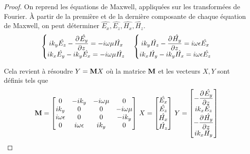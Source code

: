         \begin{proof}
            On reprend les équations de Maxwell, appliquées sur les transformées de Fourier. À partir de la première et de la dernière composante de chaque équation de Maxwell, on peut déterminer \(\hat{E_x},\hat{E_z},\hat{H_x},\hat{H_z}\).
            \begin{align*}
                \left\lbrace
                \begin{matrix}
                    ik_y \hat{E_z}  - \ddr{z}{\hat{E_y}} = -i \w \mu \hat{H_x}
                    \\
                    ik_x \hat{E_y} - ik_y \hat{E_x} = -i\w \mu \hat{H_z}
                \end{matrix}
                \right. \quad
                \left\lbrace
                \begin{matrix}
                    ik_y \hat{H_z}  - \ddr{z}{\hat{H_y}} = i \w \eps \hat{E_x}
                    \\
                    ik_x \hat{H_y} - ik_y \hat{H_x} = i\w \eps \hat{E_z}
                \end{matrix}
                \right.
            \end{align*}

            Cela revient à résoudre \(Y = \mat{M}X\) où la matrice \(\mat{M}\) et les vecteurs \(X, Y\) sont définis tels que
            \begin{equation}
              \mat{M} =
              \begin{bmatrix}
              0 & -ik_y & -i\w\mu & 0
              \\
              ik_y & 0 & 0 & -i\w\mu
              \\
              i\w\eps & 0 & 0 & -ik_y
              \\
              0 & i\w\eps & ik_y & 0
              \end{bmatrix}
              \,
              X =
              \begin{bmatrix}
                \hat{E_x}\\
                \hat{E_z}\\
                \hat{H_x}\\
                \hat{H_z}
              \end{bmatrix}
              \,
              Y =
              \begin{bmatrix}
                -\ddr{z}{\hat{E_y}}\\
                ik_x\hat{E_z}\\
                -\ddr{z}{\hat{H_y}}\\
                ik_x\hat{H_y}
              \end{bmatrix}
            \end{equation}


\end{proof}
